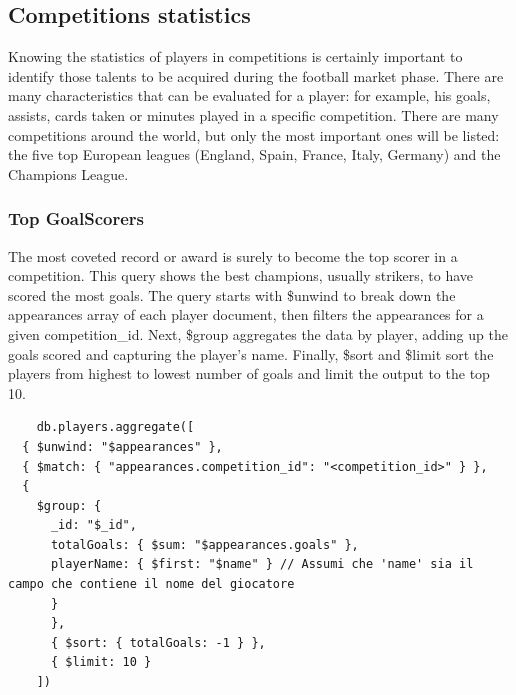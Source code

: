 \documentclass{Configuration_Files/PoliMi3i_thesis}
\begin{document}
\subsection{Competitions statistics}
Knowing the statistics of players in competitions is certainly important to identify those talents to be acquired during the football market phase. There are many characteristics that can be evaluated for a player: for example, his goals, assists, cards taken or minutes played in a specific competition.
There are many competitions around the world, but only the most important ones will be listed: the five top European leagues (England, Spain, France, Italy, Germany) and the Champions League.
\subsubsection{Top GoalScorers}
The most coveted record or award is surely to become the top scorer in a competition. This query shows the best champions, usually strikers, to have scored the most goals.
The query starts with \$unwind to break down the appearances array of each player document, then filters the appearances for a given competition\_id. Next, \$group aggregates the data by player, adding up the goals scored and capturing the player's name. Finally, \$sort and \$limit sort the players from highest to lowest number of goals and limit the output to the top 10. 
\begin{verbatim}
    db.players.aggregate([
  { $unwind: "$appearances" },
  { $match: { "appearances.competition_id": "<competition_id>" } },
  {
    $group: {
      _id: "$_id",
      totalGoals: { $sum: "$appearances.goals" },
      playerName: { $first: "$name" } // Assumi che 'name' sia il campo che contiene il nome del giocatore
      }
      },
      { $sort: { totalGoals: -1 } },
      { $limit: 10 }
    ])
    
\end{verbatim}
\newpage
\end{document}
